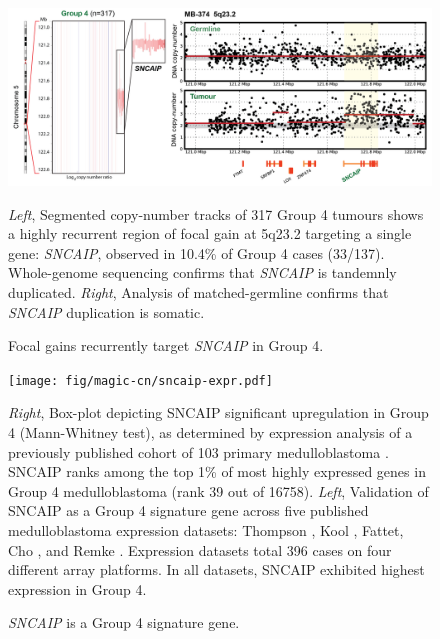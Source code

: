 \documentclass[11pt,letterpaper]{article}
\theoremstyle{definition}
\begin{document}
\clearpage

\begin{figure}[h]
	\begin{center}
		\includegraphics[width=\textwidth]{fig/magic-cn/sncaip-gain.png}
	\end{center}
	\caption{Focal gains recurrently target \emph{SNCAIP} in Group 4.}
	\emph{Left}, Segmented copy-number tracks of 317 Group 4 tumours shows a highly recurrent region of focal gain at 5q23.2 targeting a single gene: \emph{SNCAIP}, observed in 10.4\% of Group 4 cases (33/137). Whole-genome sequencing confirms that \emph{SNCAIP} is tandemnly duplicated. \emph{Right}, Analysis of matched-germline confirms that \emph{SNCAIP} duplication is somatic.
	\label{fig:sncaip-gain}
\end{figure}


\begin{figure}[h]
	\begin{center}
		\texttt{[image: fig/magic-cn/sncaip-expr.pdf]}
	\end{center}
	\caption{\emph{SNCAIP} is a Group 4 signature gene.}
	\emph{Right}, Box-plot depicting SNCAIP significant upregulation in Group 4 (Mann-Whitney test), as determined by expression analysis of a previously published cohort of 103 primary medulloblastoma . SNCAIP ranks among the top 1\% of most highly expressed genes in Group 4 medulloblastoma (rank 39 out of 16758).
	\emph{Left}, Validation of SNCAIP as a Group 4 signature gene across five published medulloblastoma expression datasets: Thompson , Kool , Fattet, Cho , and Remke . Expression datasets total 396 cases on four different array platforms. In all datasets, SNCAIP exhibited highest expression in Group 4.
	\label{fig:sncaip-expr}
\end{figure}
\end{document}
